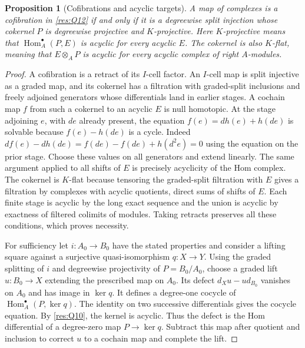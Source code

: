 \documentclass[11pt,oneside,openany]{book}
\newtheorem{proposition}[theorem]{Proposition}
\theoremstyle{definition}
\theoremstyle{remark}
\begin{document}
\begin{proposition}[Cofibrations and acyclic targets]\label{res:Q13}
A map of complexes is a cofibration in \ref{res:Q12}
if and only if it is a degreewise split injection whose
cokernel \(P\) is degreewise projective and \(K\)-projective.
Here \(K\)-projective means that
\(\operatorname{Hom}_A^\bullet(P,E)\) is acyclic for every
acyclic \(E\). The cokernel is also \(K\)-flat, meaning
that \(E\otimes_A P\) is acyclic for every acyclic complex
of right \(A\)-modules.
\end{proposition}
\begin{proof}
A cofibration is a retract of its \(I\)-cell factor.
An \(I\)-cell map is split injective as a graded map,
and its cokernel has a filtration with graded-split
inclusions and freely adjoined generators whose
differentials land in earlier stages. A cochain map \(f\)
from such a cokernel to an acyclic \(E\) is null homotopic.
At the stage adjoining \(e\), with \(de\) already present,
the equation \(f(e)=d h(e)+h(de)\) is solvable because
\(f(e)-h(de)\) is a cycle. Indeed
\(d f(e)-d h(de)=f(de)-f(de)+h(d^2e)=0\)
using the equation on the prior stage. Choose these values
on all generators and extend linearly. The same argument
applied to all shifts of \(E\) is precisely acyclicity
of the Hom complex. The cokernel is \(K\)-flat because
tensoring the graded-split filtration with \(E\) gives
a filtration by complexes with acyclic quotients, direct
sums of shifts of \(E\). Each finite stage is acyclic
by the long exact sequence and the union is acyclic
by exactness of filtered colimits of modules. Taking
retracts preserves all these conditions, which proves
necessity.

For sufficiency let \(i:A_0\to B_0\) have the stated
properties and consider a lifting square against a
surjective quasi-isomorphism \(q:X\to Y\). Using the
graded splitting of \(i\) and degreewise projectivity
of \(P=B_0/A_0\), choose a graded lift \(u:B_0\to X\)
extending the prescribed map on \(A_0\).
Its defect \(d_Xu-u d_{B_0}\) vanishes on \(A_0\)
and has image in \(\ker q\). It defines a degree-one
cocycle of \(\operatorname{Hom}_A^\bullet(P,\ker q)\).
The identity on two successive differentials gives the
cocycle equation. By \ref{res:Q10}, the kernel is
acyclic. Thus the defect is the Hom differential of
a degree-zero map \(P\to\ker q\). Subtract this
map after quotient and inclusion to correct \(u\)
to a cochain map and complete the lift.
\end{proof}
\end{document}
